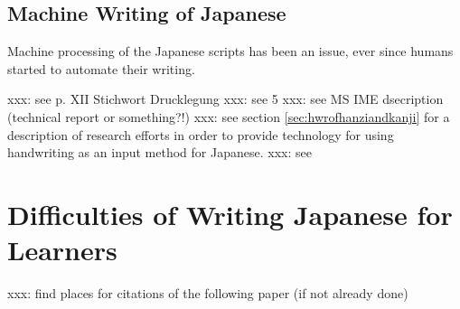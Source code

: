 
\subsection{Machine Writing of Japanese}
\label{sec:machinewritingofjapanese}

Machine processing of the Japanese scripts has been an issue, ever since humans
started to automate their writing.

xxx: see  p. XII Stichwort Drucklegung
xxx: see  5
xxx: see MS IME dsecription (technical report or something?!)
xxx: see section \ref{sec:hwrofhanziandkanji} for a description of research 
efforts in order to provide technology for using handwriting as an input method 
for Japanese.
xxx: see 


\section{Difficulties of Writing Japanese for Learners}
\label{sec:writingjapanesedifficulties}


xxx: find places for citations of the following paper (if not already done)
